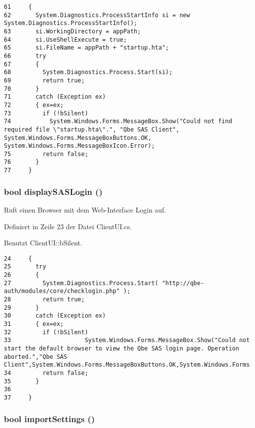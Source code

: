 \footnotesize\begin{verbatim}61     {
62       System.Diagnostics.ProcessStartInfo si = new System.Diagnostics.ProcessStartInfo();
63       si.WorkingDirectory = appPath;
64       si.UseShellExecute = true;
65       si.FileName = appPath + "startup.hta";
66       try 
67       {
68         System.Diagnostics.Process.Start(si);
69         return true;
70       } 
71       catch (Exception ex)
72       { ex=ex;
73         if (!bSilent)
74           System.Windows.Forms.MessageBox.Show("Could not find required file \"startup.hta\".", "Qbe SAS Client", System.Windows.Forms.MessageBoxButtons.OK, System.Windows.Forms.MessageBoxIcon.Error);
75         return false;
76       }
77     }
\end{verbatim}\normalsize 
\hypertarget{classQbeSAS_1_1ClientUI_QbeSAS_1_1ClientUIa1}{
\subsubsection[displaySASLogin]{\setlength{\rightskip}{0pt plus 5cm}bool display\-SASLogin ()}}
\label{classQbeSAS_1_1ClientUI_QbeSAS_1_1ClientUIa1}


Ruft einen Browser mit dem Web-Interface Login auf. 



Definiert in Zeile 23 der Datei Client\-UI.cs.

Benutzt Client\-UI::b\-Silent.



\footnotesize\begin{verbatim}24     {
25       try 
26       {
27         System.Diagnostics.Process.Start( "http://qbe-auth/modules/core/checklogin.php" );
28         return true;
29       } 
30       catch (Exception ex)
31       { ex=ex;
32         if (!bSilent)
33                     System.Windows.Forms.MessageBox.Show("Could not start the default browser to view the Qbe SAS login page. Operation aborted.","Qbe SAS Client",System.Windows.Forms.MessageBoxButtons.OK,System.Windows.Forms.MessageBoxIcon.Error);
34         return false;
35       }
36 
37     }
\end{verbatim}\normalsize 
\hypertarget{classQbeSAS_1_1ClientUI_QbeSAS_1_1ClientUIa4}{
\subsubsection[importSettings]{\setlength{\rightskip}{0pt plus 5cm}bool import\-Settings ()}}
\label{classQbeSAS_1_1ClientUI_QbeSAS_1_1ClientUIa4}


